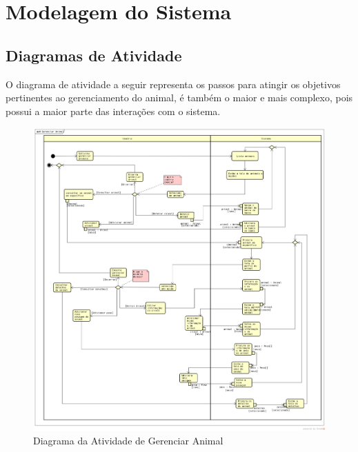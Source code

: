 \documentclass[12pt]{article}
\begin{document}
\begin{titlepage}
\begin{figure}[!h]
\begin{center}

		\end{center}
	\end{figure}


	\newpage
	\section{Modelagem do Sistema}

	\subsection{Diagramas de Atividade}

	O diagrama de atividade a seguir representa os passos para atingir os objetivos pertinentes ao gerenciamento do animal, é também o maior e mais complexo, pois possui a maior parte das interações com o sistema.

	\begin{figure}[!h]
		\begin{center}
			\caption{Diagrama da Atividade de Gerenciar Animal}
			\includegraphics[width=6in]{img/atividadeanimal.png}

		\end{center}
	\end{figure}


\end{titlepage}
\end{document}
